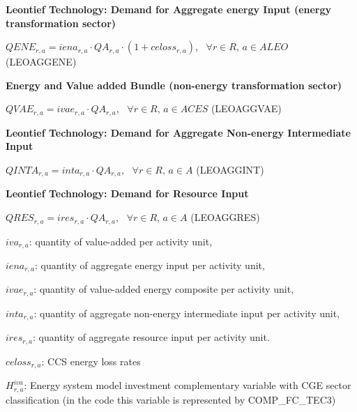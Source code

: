 \documentclass[10pt,a4paper,titlepage,dvipdfmx]{book}
\begin{document}
\begin{flushleft}\textbf{Leontief Technology: Demand for Aggregate energy Input (energy transformation sector)}\end{flushleft}


\begin{center}$QENE_{r,a}=iena_{r,a}\cdot QA_{r,a}\cdot \left(1+celoss_{r,a}\right),\,\,\,\,\forall r\in R,\,a\in ALEO$ (LEOAGGENE)
\end{center}

\begin{flushleft}\textbf{Energy and Value added Bundle (non-energy transformation sector)}\end{flushleft}


\begin{center}$QVAE_{r,a}=ivae_{r,a}\cdot QA_{r,a},\,\,\,\,\forall r\in R,\,a\in ACES$ (LEOAGGVAE)
\end{center}

\begin{flushleft}\textbf{Leontief Technology: Demand for Aggregate Non-energy Intermediate Input}\end{flushleft}


\begin{center}$QINTA_{r,a}=inta_{r,a}\cdot QA_{r,a},\,\,\,\,\forall r\in R,\,a\in A$ (LEOAGGINT)
\end{center}

\begin{flushleft}\textbf{Leontief Technology: Demand for Resource Input}\end{flushleft}


\begin{center}$QRES_{r,a}=ires_{r,a}\cdot QA_{r,a},\,\,\,\,\forall r\in R,\,a\in A$ (LEOAGGRES)\label{ref-0032}
\end{center}

\begin{flushleft}
$iva_{r,a}$: quantity of value-added per activity unit,

$iena_{r,a}$: quantity of aggregate energy input per activity unit,

$ivae_{r,a}$: quantity of value-added energy composite per activity unit,

$inta_{r,a}$: quantity of aggregate non-energy intermediate input per activity unit,

$ires_{r,a}$: quantity of aggregate resource input per activity unit.

$\textit{celoss}_{r,a}$: CCS energy loss rates

$H _{r,a}^{iva}$: Energy system model investment complementary variable with CGE sector classification (in the code this variable is represented by COMP\_FC\_TEC3)\\
\end{flushleft}
\end{document}
